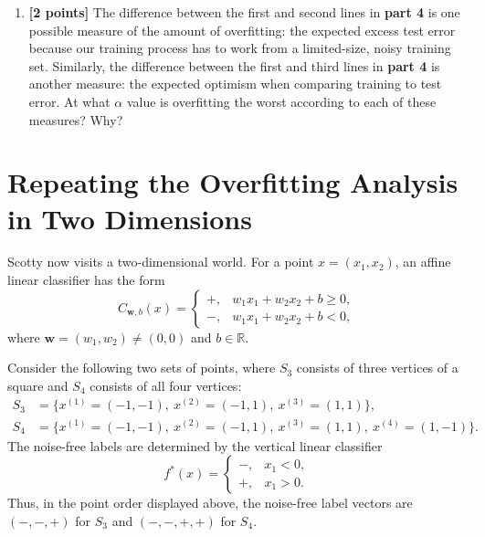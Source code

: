 \begin{enumerate}
\begin{tcolorbox}[fit,height=12cm, width=0.9\textwidth, blank, borderline={1pt}{-2pt}]
\end{tcolorbox}


\item {\bf [2 points]}
The difference between the first and second lines in \textbf{part 4} is one possible measure of the amount of overfitting: the expected excess test error because our training process has to work from a limited-size, noisy training set. Similarly, the difference between the first and third lines in \textbf{part 4} is another measure: the expected optimism when comparing training to test error. At what $\alpha$ value is overfitting the worst according to each of these measures? Why?

\begin{tcolorbox}[fit,height=5cm, width=0.9\textwidth, blank, borderline={1pt}{-2pt}]
\end{tcolorbox}


\end{enumerate}

\newpage

\section{Repeating the Overfitting Analysis in Two Dimensions}

Scotty now visits a two-dimensional world. For a point $x=(x_1,x_2)$, an
affine linear classifier has the form
\[
C_{\mathbf{w},b}(x)=
\begin{cases}
+, & w_1x_1+w_2x_2+b\geq 0,\\
-, & w_1x_1+w_2x_2+b<0,
\end{cases}
\]
where $\mathbf{w}=(w_1,w_2)\neq(0,0)$ and $b\in\mathbb{R}$.

Consider the following two sets of points, where $S_3$ consists of three
vertices of a square and $S_4$ consists of all four vertices:
\[
\begin{aligned}
S_3 &= \{x^{(1)}=(-1,-1),\ x^{(2)}=(-1,1),\ x^{(3)}=(1,1)\},\\
S_4 &= \{x^{(1)}=(-1,-1),\ x^{(2)}=(-1,1),\ x^{(3)}=(1,1),
        \ x^{(4)}=(1,-1)\}.
\end{aligned}
\]
The noise-free labels are determined by the vertical linear classifier
\[
f^*(x)=
\begin{cases}
-, & x_1<0,\\
+, & x_1>0.
\end{cases}
\]
Thus, in the point order displayed above, the noise-free label vectors are
$(-,-,+)$ for $S_3$ and $(-,-,+,+)$ for $S_4$.

